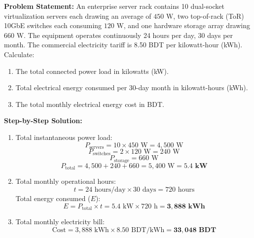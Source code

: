 \begin{tcolorbox}[colback=white,colframe=navyblue,title=\textbf{Problem 2: Data Center Server Rack Energy Consumption and Billing}]
\textbf{Problem Statement:} An enterprise server rack contains 10 dual-socket virtualization servers each drawing an average of $450\text{ W}$, two top-of-rack (ToR) 10GbE switches each consuming $120\text{ W}$, and one hardware storage array drawing $660\text{ W}$. The equipment operates continuously 24 hours per day, 30 days per month. The commercial electricity tariff is 8.50 BDT per kilowatt-hour (kWh). Calculate:
\begin{enumerate}[label=(\alph*),leftmargin=*]
    \item The total connected power load in kilowatts (kW).
    \item Total electrical energy consumed per 30-day month in kilowatt-hours (kWh).
    \item The total monthly electrical energy cost in BDT.
\end{enumerate}
\textbf{Step-by-Step Solution:}
\begin{enumerate}[label=(\alph*),leftmargin=*]
    \item Total instantaneous power load:
    \[
    P_{\text{servers}} = 10 \times 450\text{ W} = 4,500\text{ W}
    \]
    \[
    P_{\text{switches}} = 2 \times 120\text{ W} = 240\text{ W}
    \]
    \[
    P_{\text{storage}} = 660\text{ W}
    \]
    \[
    P_{\text{total}} = 4,500 + 240 + 660 = 5,400\text{ W} = \mathbf{5.4\text{ kW}}
    \]
    \item Total monthly operational hours:
    \[
    t = 24\text{ hours/day} \times 30\text{ days} = 720\text{ hours}
    \]
    Total energy consumed ($E$):
    \[
    E = P_{\text{total}} \times t = 5.4\text{ kW} \times 720\text{ h} = \mathbf{3,888\text{ kWh}}
    \]
    \item Total monthly electricity bill:
    \[
    \text{Cost} = 3,888\text{ kWh} \times 8.50\text{ BDT/kWh} = \mathbf{33,048\text{ BDT}}
    \]
\end{enumerate}
\end{tcolorbox}

